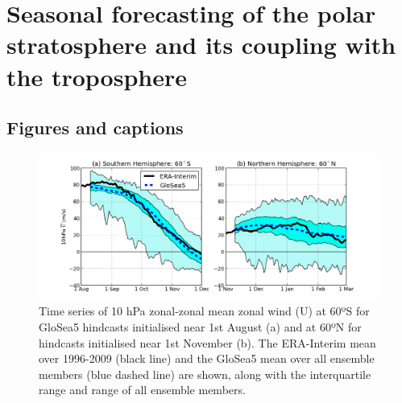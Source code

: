 \section{Seasonal forecasting of the polar stratosphere and its coupling
with the
troposphere}\label{seasonal-forecasting-of-the-polar-stratosphere-and-its-coupling-with-the-troposphere}

\subsection{Figures and captions}\label{figures-and-captions}

\begin{figure}[htbp]
\centering
\includegraphics{./figures/zm_winds.png}
\caption{Time series of 10 hPa zonal-zonal mean zonal wind (U) at 60ºS
for GloSea5 hindcasts initialised near 1st August (a) and at 60ºN for
hindcasts initialised near 1st November (b). The ERA-Interim mean over
1996-2009 (black line) and the GloSea5 mean over all ensemble members
(blue dashed line) are shown, along with the interquartile range and
range of all ensemble members. ~}
\end{figure}
